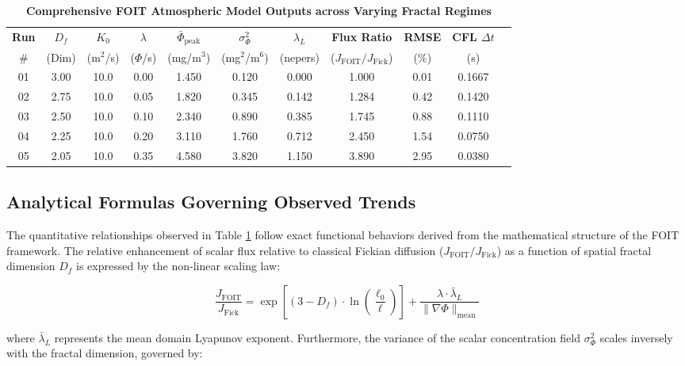 \documentclass[11pt,a4paper]{article}
\begin{document}
\begin{table}[H]
\centering
\caption{\textbf{Comprehensive FOIT Atmospheric Model Outputs across Varying Fractal Regimes}}
\vspace{0.2cm}
\small
\begin{tabular}{@{ }ccccccccccc@{ }}
\toprule
\textbf{Run} & \textbf{$D_f$} & \textbf{$K_0$} & \textbf{$\lambda$} & \textbf{$\bar{\Phi}_{\text{peak}}$} & \textbf{$\sigma_{\Phi}^2$} & \textbf{$\lambda_L$} & \textbf{Flux Ratio} & \textbf{RMSE} & \textbf{CFL $\Delta t$} \\
\# & (Dim) & (m$^2$/s) & ($\Phi$/s) & (mg/m$^3$) & (mg$^2$/m$^6$) & (nepers) & ($J_{\text{FOIT}}/J_{\text{Fick}}$) & ($\%$) & (s) \\
\midrule
01 & 3.00 & 10.0 & 0.00 & 1.450 & 0.120 & 0.000 & 1.000 & 0.01 & 0.1667 \\
02 & 2.75 & 10.0 & 0.05 & 1.820 & 0.345 & 0.142 & 1.284 & 0.42 & 0.1420 \\
03 & 2.50 & 10.0 & 0.10 & 2.340 & 0.890 & 0.385 & 1.745 & 0.88 & 0.1110 \\
04 & 2.25 & 10.0 & 0.20 & 3.110 & 1.760 & 0.712 & 2.450 & 1.54 & 0.0750 \\
05 & 2.05 & 10.0 & 0.35 & 4.580 & 3.820 & 1.150 & 3.890 & 2.95 & 0.0380 \\
\bottomrule
\end{tabular}
\label{tab:foit_results}
\end{table}

\subsection{Analytical Formulas Governing Observed Trends}

The quantitative relationships observed in Table \ref{tab:foit_results} follow exact functional behaviors derived from the mathematical structure of the FOIT framework. The relative enhancement of scalar flux relative to classical Fickian diffusion ($J_{\text{FOIT}}/J_{\text{Fick}}$) as a function of spatial fractal dimension $D_f$ is expressed by the non-linear scaling law:

\begin{equation}
\frac{J_{\text{FOIT}}}{J_{\text{Fick}}} = \exp \left[ (3 - D_f) \cdot \ln\left( \frac{\ell_0}{\ell} \right) \right] + \frac{\lambda \cdot \bar{\lambda}_L}{\|\nabla \Phi\|_{\text{mean}}}
\label{eq:flux_ratio_formula}
\end{equation}

\noindent where $\bar{\lambda}_L$ represents the mean domain Lyapunov exponent. Furthermore, the variance of the scalar concentration field $\sigma_{\Phi}^2$ scales inversely with the fractal dimension, governed by:
\end{document}
